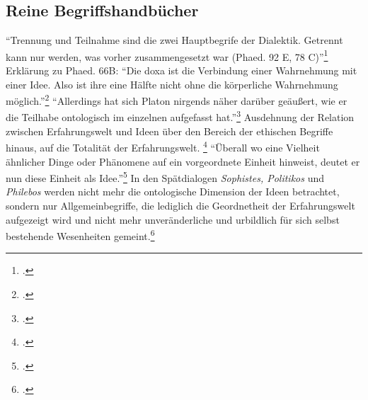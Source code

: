 \documentclass[12pt]{article}
\begin{document}
\subsection*{Reine Begriffshandbücher}
\enquote{Trennung und Teilnahme sind die zwei Hauptbegrife der Dialektik. Getrennt kann nur werden, was vorher zusammengesetzt war (Phaed. 92 E, 78 C)}\footcite[][S. 349]{Perls}
Erklärung zu Phaed. 66B: \enquote{Die doxa ist die Verbindung einer Wahrnehmung mit einer Idee. Also ist ihre eine Hälfte nicht ohne die körperliche Wahrnehmung möglich.}\footcite[][S. 350]{Perls}
\enquote{Allerdings hat sich Platon nirgends näher darüber geäußert, wie er die Teilhabe ontologisch im einzelnen aufgefasst hat.}\footcite[][S. 172]{Gigon75}
Ausdehnung der Relation zwischen Erfahrungswelt und Ideen über den Bereich der ethischen Begriffe hinaus, auf die Totalität der Erfahrungswelt. \footcite[vgl.][S. 172]{Gigon75} \enquote{Überall wo eine Vielheit ähnlicher Dinge oder Phänomene auf ein vorgeordnete Einheit hinweist, deutet er nun diese Einheit als Idee.}\footcite[][S. 172]{Gigon75}
In den Spätdialogen \emph{Sophistes, Politikos} und \emph{Philebos} werden nicht mehr die ontologische Dimension der Ideen betrachtet, sondern nur Allgemeinbegriffe, die lediglich die Geordnetheit der Erfahrungswelt aufgezeigt wird und nicht mehr unveränderliche und urbildlich für sich selbst bestehende Wesenheiten gemeint.\footcite[vgl.][S. 174]{Gigon75}
\end{document}
